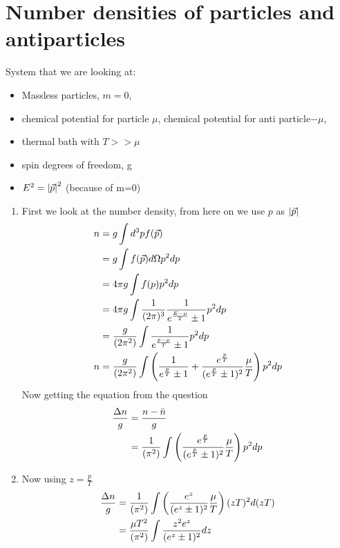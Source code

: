 \section{Number densities of particles and antiparticles}
System that we are looking at: 
\begin{itemize}
\item Massless particles, $m=0$,
\item chemical potential for particle $\mu$, chemical potential for anti particle$-\mu$,
\item thermal bath with $T>>\mu$
\item spin degrees of freedom, g
\item $E^2 = \abs{\vec{p}}^2$ (because of m=0)
\end{itemize}
\begin{enumerate}[label=(\alph*)]
\item First we look at the number density, from here on we use $p$ as $\abs{\vec{p}}$ 
\begin{align}
n 	&= g \int d^{3} p f( \vec{p} ) \\ \notag 
	&= g \int 	f(\vec{p}) d\Omega p^2 dp \notag \\
	&= 4\pi g \int 	f(p) p^2 dp \notag  \\ 
	&= 4\pi g \int 	\frac{1}{(2\pi)^3} \frac{1}{e^{\frac{E-\mu}{T}}\pm 1}p^2 dp \notag  \\ 
	&= \frac{g}{(2\pi^2)} \int \frac{1}{e^{\frac{p-\mu}{T}}\pm 1}p^2 dp \notag \\ 
n 	&= \frac{g}{(2\pi^2)} \int \left( \frac{1}{e^{\frac{p}{T}}\pm 1} + \frac{e^{\frac{p}{T}}}{(e^{\frac{p}{T}}\pm 1)^2}\frac{\mu}{T}\right)p^2 dp  
\end{align}
Now getting the equation from the question
\begin{align}
\frac{\Delta n}{g} 	&= \frac{n-\bar{n}}{g} \\ \notag
				&= \frac{1}{(\pi^2)} \int \left( \frac{e^{\frac{p}{T}}}{(e^{\frac{p}{T}}\pm 1)^2}\frac{\mu}{T}\right)p^2 dp \notag
\end{align}
\item  Now using $z=\frac{p}{T}$
\begin{align}
\frac{\Delta n}{g}	&= \frac{1}{(\pi^2)} \int \left( \frac{e^{z}}{(e^{z}\pm 1)^2} \frac{\mu}{T} \right)(zT)^2 d(zT) \\ \notag
				&= \frac{\mu T^2}{(\pi^2)} \int \frac{z^2 e^{z}}{(e^{z} \pm 1)^2} dz \notag
\end{align}
\end{enumerate}